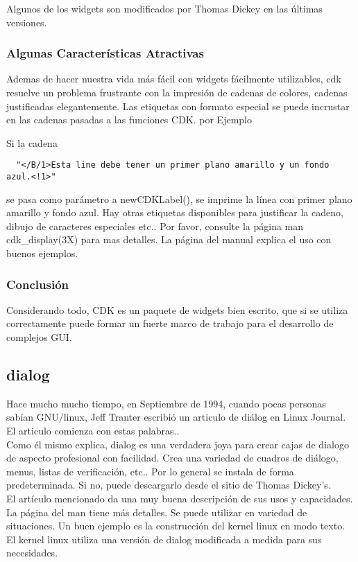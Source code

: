 \documentclass{article}
\begin{document}
Algunos de los widgets son modificados por Thomas Dickey en las últimas versiones.

\subsubsection{Algunas Características Atractivas}%
Ademas de hacer nuestra vida más fácil con widgets fácilmente utilizables, cdk
resuelve un problema frustrante con la impresión de cadenas de colores, cadenas
justificadas elegantemente. Las etiquetas con formato especial se puede
incrustar en las cadenas pasadas a las funciones CDK. por Ejemplo

Si la cadena
\begin{verbatim}
  "</B/1>Esta line debe tener un primer plano amarillo y un fondo azul.<!1>"
\end{verbatim}

se pasa como parámetro a newCDKLabel(), se imprime la línea con primer plano
amarillo y fondo azul. Hay otras etiquetas disponibles para justificar la
cadeno, dibujo de caracteres especiales etc.. Por favor, consulte la página man
cdk\_display(3X) para mas detalles. La página del manual explica el uso con
buenos ejemplos.

\subsubsection{Conclusión}%
Considerando todo, CDK es un paquete de widgets bien escrito, que si se utiliza
correctamente puede formar un fuerte marco de trabajo para el desarrollo de
complejos GUI.

\subsection{dialog}%
Hace mucho mucho tiempo, en Septiembre de 1994, cuando pocas personas sabían
GNU/linux, Jeff Tranter escribió un articulo de diálog en Linux Journal. El
articulo comienza con estas palabras..\\

Como él mismo explica, dialog es una verdadera joya para crear cajas de dialogo
de aspecto profesional con facilidad. Crea una variedad de cuadros de diálogo,
menus, listas de verificación, etc.. Por lo general se instala de forma
predeterminada. Si no, puede descargarlo desde el sitio de Thomas Dickey’s.\\

El artículo mencionado da una muy buena descripción de sus usos y capacidades.
La página del man tiene más detalles. Se puede utilizar en variedad de
situaciones. Un buen ejemplo es la construcción del kernel linux en modo texto.
El kernel linux utiliza una versión de dialog modificada a medida para sus
necesidades.\\
\end{document}
